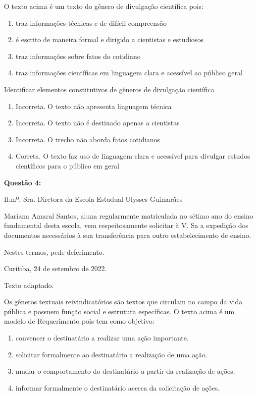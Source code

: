 {O texto acima é um texto do gênero de divulgação científica pois:

\begin{enumerate}
\def\labelenumi{\alph{enumi})}
\item
  traz informações técnicas e de difícil compreensão
\item
  é escrito de maneira formal e dirigido a cientistas e estudiosos
\item
  traz informações sobre fatos do cotidiano
\item
  traz informações científicas em linguagem clara e acessível ao público
  geral
\end{enumerate}

Identificar elementos constitutivos de gêneros de divulgação científica

\begin{enumerate}
\def\labelenumi{\arabic{enumi}.}
\item
  Incorreta. O texto não apresenta linguagem técnica
\item
  Incorreta. O texto não é destinado apenas a cientistas
\item
  Incorreta. O trecho não aborda fatos cotidianos
\item
  Correta. O texto faz uso de linguagem clara e acessível para divulgar
  estudos científicos para o público em geral
\end{enumerate}

\textbf{Questão 4:}

Il.mº. Sra. Diretora da Escola Estadual Ulysses Guimarães

Mariana Amaral Santos, aluna regularmente matriculada no sétimo ano do
ensino fundamental desta escola, vem respeitosamente solicitar à V. Sa a
expedição dos documentos necessários à sua transferência para outro
estabelecimento de ensino.

Nestes termos, pede deferimento.

Curitiba, 24 de setembro de 2022.

Texto adaptado.

Os gêneros textuais reivindicatórios são textos que circulam no campo da
vida pública e possuem função social e estrutura específicas. O texto
acima é um modelo de Requerimento pois tem como objetivo:

\begin{enumerate}
\def\labelenumi{\arabic{enumi}.}
\item
  convencer o destinatário a realizar uma ação importante.
\item
  solicitar formalmente ao destinatário a realização de uma ação.
\item
  mudar o comportamento do destinatário a partir da realização de ações.
\item
  informar formalmente o destinatário acerca da solicitação de ações.
\end{enumerate}

}
